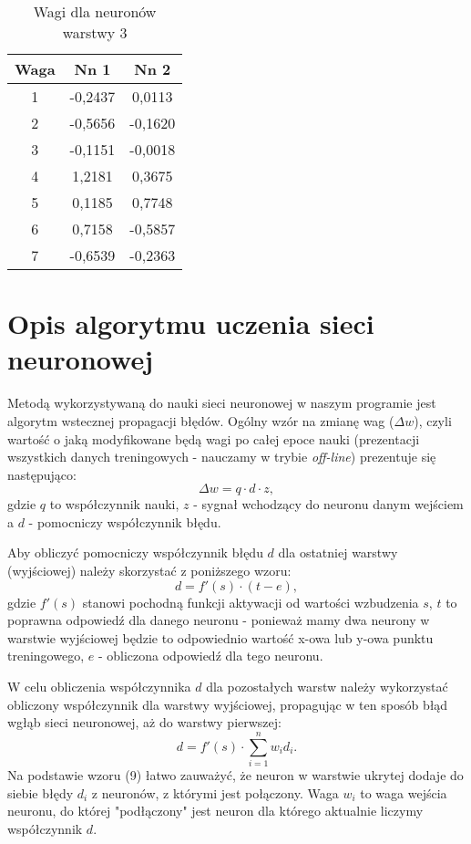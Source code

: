 \documentclass{classrep}
\begin{document}
\begin{table}[H]
	\centering
	\begin{tabular}{c c c} 
		\hline
		\textbf{Waga} & \textbf{Nn 1} & \textbf{Nn 2}\\ [0.5ex] 
		\hline
		\hline 
1	&	-0,2437	&	0,0113	\\
2	&	-0,5656	&	-0,1620	\\
3	&	-0,1151	&	-0,0018	\\
4	&	1,2181	&	0,3675	\\
5	&	0,1185	&	0,7748	\\
6	&	0,7158	&	-0,5857	\\
7	&	-0,6539	&	-0,2363	\\
		\hline
	\end{tabular}
	\caption{Wagi dla neuronów warstwy 3}
\end{table}

\section{Opis algorytmu uczenia sieci neuronowej}

Metodą wykorzystywaną do nauki sieci neuronowej w naszym programie jest algorytm wstecznej propagacji błędów. Ogólny wzór na zmianę wag ($\Delta w$), czyli wartość o jaką modyfikowane będą wagi po całej epoce nauki (prezentacji wszystkich danych treningowych - nauczamy w trybie \textit{off-line}) prezentuje się następująco:
\begin{equation}
	\Delta w = q \cdot d \cdot z,
\end{equation}
gdzie $q$ to współczynnik nauki, $z$ - sygnał wchodzący do neuronu danym wejściem a $d$ - pomocniczy współczynnik błędu.\newline

Aby obliczyć pomocniczy współczynnik błędu $d$ dla ostatniej warstwy (wyjściowej) należy skorzystać z poniższego wzoru:
\begin{equation}
	d = f'(s) \cdot (t - e),
\end{equation}
gdzie $f'(s)$ stanowi pochodną funkcji aktywacji od wartości wzbudzenia $s$, $t$ to poprawna odpowiedź dla danego neuronu - ponieważ mamy dwa neurony w warstwie wyjściowej będzie to odpowiednio wartość x-owa lub y-owa punktu treningowego, $e$ - obliczona odpowiedź dla tego neuronu.\newline

W celu obliczenia współczynnika $d$ dla pozostałych warstw należy wykorzystać obliczony współczynnik dla warstwy wyjściowej, propagując w ten sposób błąd wgłąb sieci neuronowej, aż do warstwy pierwszej:
\begin{equation}
	d = f'(s) \cdot \sum_{i=1}^{n} w_i d_i.
\end{equation}
Na podstawie wzoru (9) łatwo zauważyć, że neuron w warstwie ukrytej dodaje do siebie błędy $d_i$ z neuronów, z którymi jest połączony. Waga $w_i$ to waga wejścia neuronu, do której "podłączony" jest neuron dla którego aktualnie liczymy współczynnik $d$.
\end{document}
